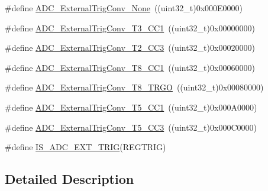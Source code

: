 \begin{DoxyCompactItemize}
\item 
\#define \mbox{\hyperlink{group___a_d_c__external__trigger__sources__for__regular__channels__conversion_ga433a3845ed1792fa6359b763c955e9c2}{A\+D\+C\+\_\+\+External\+Trig\+Conv\+\_\+\+None}}~((uint32\+\_\+t)0x000\+E0000)
\item 
\#define \mbox{\hyperlink{group___a_d_c__external__trigger__sources__for__regular__channels__conversion_ga3c73d5c8bb0f898dbbc74bcc536f6ec1}{A\+D\+C\+\_\+\+External\+Trig\+Conv\+\_\+\+T3\+\_\+\+C\+C1}}~((uint32\+\_\+t)0x00000000)
\item 
\#define \mbox{\hyperlink{group___a_d_c__external__trigger__sources__for__regular__channels__conversion_ga16ae1b335f2c2b4facf3d4bedc2ce27f}{A\+D\+C\+\_\+\+External\+Trig\+Conv\+\_\+\+T2\+\_\+\+C\+C3}}~((uint32\+\_\+t)0x00020000)
\item 
\#define \mbox{\hyperlink{group___a_d_c__external__trigger__sources__for__regular__channels__conversion_ga97af875d12e77a67e84f3aaf1f8033ed}{A\+D\+C\+\_\+\+External\+Trig\+Conv\+\_\+\+T8\+\_\+\+C\+C1}}~((uint32\+\_\+t)0x00060000)
\item 
\#define \mbox{\hyperlink{group___a_d_c__external__trigger__sources__for__regular__channels__conversion_gab26d94590d47ae6ec46841652741abf3}{A\+D\+C\+\_\+\+External\+Trig\+Conv\+\_\+\+T8\+\_\+\+T\+R\+GO}}~((uint32\+\_\+t)0x00080000)
\item 
\#define \mbox{\hyperlink{group___a_d_c__external__trigger__sources__for__regular__channels__conversion_ga6bd1ad69cb455afeabf6759b640378d3}{A\+D\+C\+\_\+\+External\+Trig\+Conv\+\_\+\+T5\+\_\+\+C\+C1}}~((uint32\+\_\+t)0x000\+A0000)
\item 
\#define \mbox{\hyperlink{group___a_d_c__external__trigger__sources__for__regular__channels__conversion_ga95b58981aff35d6d5fa229925cd6315d}{A\+D\+C\+\_\+\+External\+Trig\+Conv\+\_\+\+T5\+\_\+\+C\+C3}}~((uint32\+\_\+t)0x000\+C0000)
\item 
\#define \mbox{\hyperlink{group___a_d_c__external__trigger__sources__for__regular__channels__conversion_gac74e6054adbedd72822cacde69105318}{I\+S\+\_\+\+A\+D\+C\+\_\+\+E\+X\+T\+\_\+\+T\+R\+IG}}(R\+E\+G\+T\+R\+IG)
\end{DoxyCompactItemize}


\subsection{Detailed Description}



